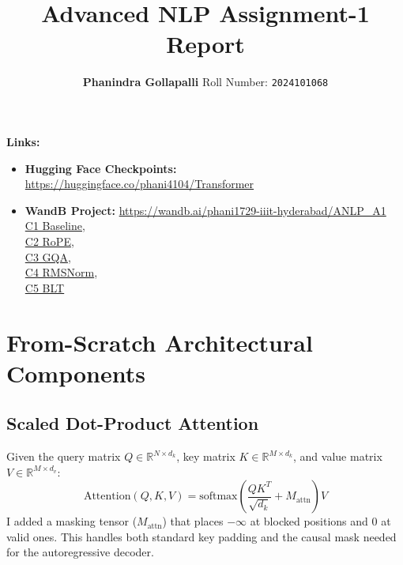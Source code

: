 \documentclass[12pt,a4paper]{article}
\title{\vspace{-1.5em}\textbf{Advanced NLP Assignment-1 Report}\vspace{-0.5em}}
\author{\textbf{Phanindra Gollapalli} \quad\textbar\quad Roll Number: \texttt{2024101068}}
\date{} %
\begin{document}
\maketitle

\noindent\textbf{Links:}
\begin{itemize}
    \item \textbf{Hugging Face Checkpoints:} \url{https://huggingface.co/phani4104/Transformer}
    \item \textbf{WandB Project:} \url{https://wandb.ai/phani1729-iiit-hyderabad/ANLP_A1}\\
    \href{https://wandb.ai/phani1729-iiit-hyderabad/ANLP_A1/runs/rmflfhfi}{C1 Baseline}, \\
     \href{https://wandb.ai/phani1729-iiit-hyderabad/ANLP_A1/runs/p66vs720}{C2 RoPE}, \\
     \href{https://wandb.ai/phani1729-iiit-hyderabad/ANLP_A1/runs/zr218vg4}{C3 GQA}, \\
     \href{https://wandb.ai/phani1729-iiit-hyderabad/ANLP_A1/runs/ux2iiyfy}{C4 RMSNorm},\\ 
     \href{https://wandb.ai/phani1729-iiit-hyderabad/ANLP_A1/runs/t2fsc4do}{C5 BLT}
\end{itemize}

\section{From-Scratch Architectural Components}

\subsection{Scaled Dot-Product Attention}
Given the query matrix $Q \in \mathbb{R}^{N \times d_k}$, key matrix $K \in \mathbb{R}^{M \times d_k}$, and value matrix $V \in \mathbb{R}^{M \times d_v}$:
\begin{equation}
\text{Attention}(Q, K, V) = \text{softmax}\left(\frac{Q K^T}{\sqrt{d_k}} + M_{\text{attn}}\right) V
\end{equation}
I added a masking tensor ($M_{\text{attn}}$) that places $-\infty$ at blocked positions and $0$ at valid ones. This handles both standard key padding and the causal mask needed for the autoregressive decoder.
\end{document}
